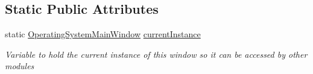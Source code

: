 \subsection*{Static Public Attributes}
\begin{DoxyCompactItemize}
\item 
static \hyperlink{class_c_p_u___o_s___simulator_1_1_operating_system_main_window}{Operating\+System\+Main\+Window} \hyperlink{class_c_p_u___o_s___simulator_1_1_operating_system_main_window_ac659b34226b30276331daba60ec7d439}{current\+Instance}
\begin{DoxyCompactList}\small\item\em Variable to hold the current instance of this window so it can be accessed by other modules \end{DoxyCompactList}\end{DoxyCompactItemize}
